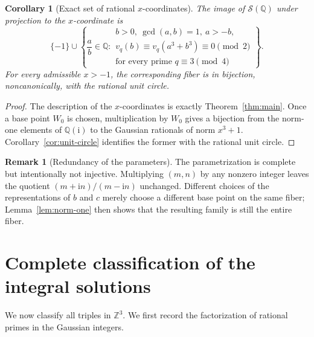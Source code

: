 \documentclass[11pt,a4paper]{article}
\numberwithin{equation}{section}
\newtheorem{corollary}[theorem]{Corollary}
\theoremstyle{definition}
\newtheorem{remark}[theorem]{Remark}
\newcommand{\Q}{\mathbb{Q}}
\newcommand{\Z}{\mathbb{Z}}
\newcommand{\ii}{\mathrm{i}}
\begin{document}
\begin{corollary}[Exact set of rational $x$-coordinates]
\label{cor:x-coordinates}
The image of $\mathcal S(\Q)$ under projection to the $x$-coordinate is
\begin{equation}
 \{-1\}\cup
 \left\{
 \frac ab\in\Q:
 \begin{array}{l}
 b>0,\ \gcd(a,b)=1,\ a>-b,\\
 v_q(b)\equiv v_q(a^3+b^3)\equiv0\pmod2\\
 \text{for every prime }q\equiv3\pmod4
 \end{array}
 \right\}.
 \label{eq:x-coordinate-set}
\end{equation}
For every admissible $x>-1$, the corresponding fiber is in bijection, noncanonically, with the rational unit circle.
\end{corollary}

\begin{proof}
The description of the $x$-coordinates is exactly Theorem~\ref{thm:main}. Once a base point $W_0$ is chosen, multiplication by $W_0$ gives a bijection from the norm-one elements of $\Q(\ii)$ to the Gaussian rationals of norm $x^3+1$. Corollary~\ref{cor:unit-circle} identifies the former with the rational unit circle.
\end{proof}

\begin{remark}[Redundancy of the parameters]
The parametrization is complete but intentionally not injective. Multiplying $(m,n)$ by any nonzero integer leaves the quotient $(m+\ii n)/(m-\ii n)$ unchanged. Different choices of the representations of $b$ and $c$ merely choose a different base point on the same fiber; Lemma~\ref{lem:norm-one} then shows that the resulting family is still the entire fiber.
\end{remark}

\section{Complete classification of the integral solutions}

We now classify all triples in $\Z^3$. We first record the factorization of rational primes in the Gaussian integers.
\end{document}
